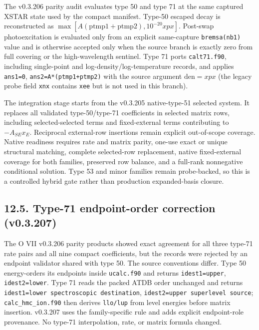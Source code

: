 \documentclass[
  10pt,
]{article}
\begin{document}
The v0.3.206 parity audit evaluates type 50 and type 71 at the same captured XSTAR state used by the compact manifest. Type-50 escaped decay is reconstructed as $\max[A(\mathrm{ptmp1}+\mathrm{ptmp2}),10^{-20}xpx]$. Post-swap photoexcitation is evaluated only from an explicit same-capture \texttt{bremsa(nb1)} value and is otherwise accepted only when the source branch is exactly zero from full covering or the high-wavelength sentinel. Type 71 ports \texttt{calt71.f90}, including single-point and log-density/log-temperature records, and applies \texttt{ans1=0}, \texttt{ans2=A*(ptmp1+ptmp2)} with the source argument $\mathrm{den}=xpx$ (the legacy probe field \texttt{xnx} contains \texttt{xee} but is not used in this branch).

The integration stage starts from the v0.3.205 native-type-51 selected system. It replaces all validated type-50/type-71 coefficients in selected matrix rows, including selected-selected terms and fixed-external terms contributing to $-A_{SE}x_E$. Reciprocal external-row insertions remain explicit out-of-scope coverage. Native readiness requires rate and matrix parity, one-use exact or unique structural matching, complete selected-row replacement, native fixed-external coverage for both families, preserved row balance, and a full-rank nonnegative conditional solution. Type 53 and minor families remain probe-backed, so this is a controlled hybrid gate rather than production expanded-basis closure.

\subsection{12.5. Type-71 endpoint-order correction (v0.3.207)}

The O VII v0.3.206 parity products showed exact agreement for all three type-71 rate pairs and all nine compact coefficients, but the records were rejected by an endpoint validator shared with type 50. The source conventions differ. Type 50 energy-orders its endpoints inside \texttt{ucalc.f90} and returns \texttt{idest1=upper}, \texttt{idest2=lower}. Type 71 reads the packed ATDB order unchanged and returns \texttt{idest1=lower spectroscopic destination}, \texttt{idest2=upper superlevel source}; \texttt{calc\_hmc\_ion.f90} then derives \texttt{llo/lup} from level energies before matrix insertion. v0.3.207 uses the family-specific rule and adds explicit endpoint-role provenance. No type-71 interpolation, rate, or matrix formula changed.
\end{document}
